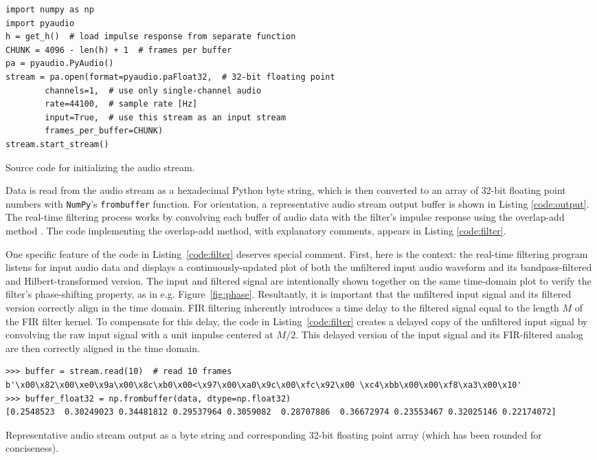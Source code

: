 \begin{listing}[htb!]
\begin{verbatim}
import numpy as np
import pyaudio
h = get_h()  # load impulse response from separate function
CHUNK = 4096 - len(h) + 1  # frames per buffer
pa = pyaudio.PyAudio()
stream = pa.open(format=pyaudio.paFloat32,  # 32-bit floating point
        channels=1,  # use only single-channel audio
        rate=44100,  # sample rate [Hz]
        input=True,  # use this stream as an input stream
        frames_per_buffer=CHUNK)
stream.start_stream()
\end{verbatim}
    \vspace{-1ex}
    \caption{Source code for initializing the audio stream.}
    \label{code:stream}
\end{listing}

Data is read from the audio stream as a hexadecimal Python byte string, which is then converted to an array of 32-bit floating point numbers with \texttt{NumPy}'s \texttt{frombuffer} function.
For orientation, a representative audio stream output buffer is shown in Listing \ref{code:output}.
The real-time filtering process works by convolving each buffer of audio data with the filter's impulse response using the overlap-add method \cite{convolution}.
The code implementing the overlap-add method, with explanatory comments, appears in Listing \ref{code:filter}.

One specific feature of the code in Listing~\ref{code:filter} deserves special comment.
First, here is the context: the real-time filtering program listens for input audio data and displays a continuously-updated plot of both the unfiltered input audio waveform and its bandpass-filtered and Hilbert-transformed version.
The input and filtered signal are intentionally shown together on the same time-domain plot to verify the filter's phase-shifting property, as in e.g. Figure~\ref{fig:phase}.
Resultantly, it is important that the unfiltered input signal and its filtered version correctly align in the time domain.
FIR filtering inherently introduces a time delay to the filtered signal equal to the length $ M $ of the FIR filter kernel.
To compensate for this delay, the code in Listing~\ref{code:filter} creates a delayed copy of the unfiltered input signal by convolving the raw input signal with a unit impulse centered at $ M / 2 $.
This delayed version of the input signal and its FIR-filtered analog are then correctly aligned in the time domain.

\begin{listing}
\begin{verbatim}
>>> buffer = stream.read(10)  # read 10 frames
b'\x00\x82\x00\xe0\x9a\x00\x8c\xb0\x00<\x97\x00\xa0\x9c\x00\xfc\x92\x00 \xc4\xbb\x00\x00\xf8\xa3\x00\x10'
>>> buffer_float32 = np.frombuffer(data, dtype=np.float32)
[0.2548523  0.30249023 0.34481812 0.29537964 0.3059082  0.28707886  0.36672974 0.23553467 0.32025146 0.22174072]
\end{verbatim}   
    \vspace{-1ex}
    \caption{Representative audio stream output as a byte string and corresponding 32-bit floating point array (which has been rounded for conciseness).}
    \label{code:output}
\end{listing}

